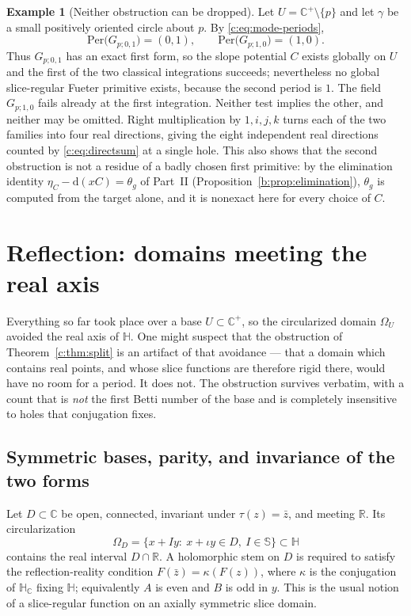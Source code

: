 \documentclass[11pt,a4paper]{article}
\numberwithin{equation}{section}
\theoremstyle{definition}
\newtheorem{example}[theorem]{Example}
\theoremstyle{remark}
\theoremstyle{plain}
\newcommand{\HH}{\mathbb H}
\newcommand{\HC}{\mathbb H_{\mathbb C}}
\newcommand{\RR}{\mathbb R}
\newcommand{\CC}{\mathbb C}
\newcommand{\SSS}{\mathbb S}
\newcommand{\Cplus}{\CC^{+}}
\newcommand{\Om}{\Omega}
\newcommand{\thet}{\theta}
\newcommand{\etaC}{\eta_{C}}
\newcommand{\Per}{\mathrm{Per}}
\newcommand{\pot}{C}          %
\newcommand{\dd}{\mathrm d}
\begin{document}
\begin{example}[Neither obstruction can be dropped]
\label{c:ex:independent}
Let $U=\Cplus\setminus\{p\}$ and let $\gamma$ be a small positively
oriented circle about $p$.  By \eqref{c:eq:mode-periods},
\[
  \Per\bigl(G_{p;0,1}\bigr)=(0,1),\qquad
  \Per\bigl(G_{p;1,0}\bigr)=(1,0).
\]
Thus $G_{p;0,1}$ has an exact first form, so the slope potential $\pot$
exists globally on $U$ and the first of the two classical integrations
succeeds; nevertheless no global slice-regular Fueter primitive exists,
because the second period is $1$.  The field $G_{p;1,0}$ fails already at
the first integration.  Neither test implies the other, and neither may
be omitted.  Right multiplication by $1,i,j,k$ turns each of the two
families into four real directions, giving the eight independent real
directions counted by \eqref{c:eq:directsum} at a single hole.  This also
shows that the second obstruction is not a residue of a badly chosen
first primitive: by the elimination identity $\etaC-\dd(x\pot)=\thet_g$ of Part~II (Proposition~\ref{b:prop:elimination}), $\thet_g$ is computed from the
target alone, and it is nonexact here for every choice of $\pot$.
\end{example}


\section{Reflection: domains meeting the real axis}
\label{c:sec:reflection}

Everything so far took place over a base $U\subset\Cplus$, so the
circularized domain $\Om_U$ avoided the real axis of $\HH$.  One might
suspect that the obstruction of Theorem~\ref{c:thm:split} is an artifact
of that avoidance — that a domain which contains real points, and whose
slice functions are therefore rigid there, would have no room for a
period.  It does not.  The obstruction survives verbatim, with a count
that is \emph{not} the first Betti number of the base and is completely
insensitive to holes that conjugation fixes.

\subsection{Symmetric bases, parity, and invariance of the two forms}

Let $D\subset\CC$ be open, connected, invariant under
$\tau(z)=\bar z$, and meeting $\RR$.  Its circularization
\[
  \Om_D=\{x+Iy:\ x+\iota y\in D,\ I\in\SSS\}\subset\HH
\]
contains the real interval $D\cap\RR$.  A holomorphic stem on $D$ is
required to satisfy the reflection-reality condition
$F(\bar z)=\kappa(F(z))$, where $\kappa$ is the conjugation of $\HC$
fixing $\HH$; equivalently $A$ is even and $B$ is odd in $y$.  This is
the usual notion of a slice-regular function on an axially symmetric
slice domain.
\end{document}
